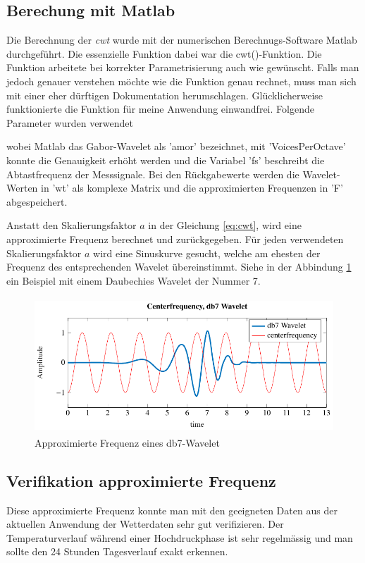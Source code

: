 \begin{refsection}
\subsection{Berechung mit Matlab}
Die Berechnung der \textit{cwt} wurde mit der numerischen Berechnugs-Software Matlab durchgeführt.
Die essenzielle Funktion dabei war die cwt()-Funktion.
Die Funktion arbeitete bei korrekter Parametrisierung auch wie gewünscht.
Falls man jedoch genauer verstehen möchte wie die Funktion genau rechnet, muss man sich mit einer eher dürftigen Dokumentation herumschlagen.
Glücklicherweise funktionierte die Funktion für meine Anwendung einwandfrei.
Folgende Parameter wurden verwendet

\label{fig:matlab_code_cwt}
wobei Matlab das Gabor-Wavelet als 'amor' bezeichnet, mit 'VoicesPerOctave' konnte die Genauigkeit erhöht werden und die Variabel 'fs' beschreibt die Abtastfrequenz der Messsignale.
Bei den Rückgabewerte werden die Wavelet-Werten in 'wt' als komplexe Matrix und die approximierten Frequenzen in 'F' abgespeichert.

Anstatt den Skalierungsfaktor $a$ in der Gleichung \ref{eq:cwt}, wird eine approximierte Frequenz berechnet und zurückgegeben.
Für jeden verwendeten Skalierungsfaktor $a$ wird eine Sinuskurve gesucht, welche am ehesten der Frequenz des entsprechenden Wavelet übereinstimmt.
Siehe in der Abbindung \ref{fig:centerf} ein Beispiel mit einem Daubechies Wavelet der Nummer 7.
\begin{figure}
	\centering
	\includegraphics[width=1\textwidth, height=2in]{papers/wwt/images/centerf.pdf}
	\caption{Approximierte Frequenz eines db7-Wavelet}
	\label{fig:centerf}
\end{figure}


\newpage
\subsection{Verifikation approximierte Frequenz}
Diese approximierte Frequenz konnte man mit den geeigneten Daten aus der aktuellen Anwendung der Wetterdaten sehr gut verifizieren.
Der Temperaturverlauf während einer Hochdruckphase ist sehr regelmässig und man sollte den 24 Stunden Tagesverlauf exakt erkennen.


\end{refsection}

